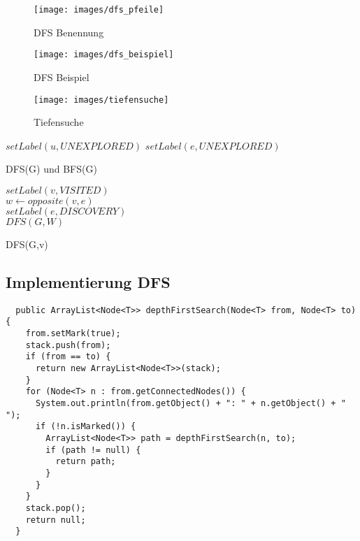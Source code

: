 \begin{figure}[ht!]
	\centering
	\begin{minipage}[t]{0.5\textwidth}
		\centering
		\texttt{[image: images/dfs\_pfeile]}
		\caption{DFS Benennung}
		\label{fig:dfsbenennung}
	\end{minipage}
	\centering
	\begin{minipage}[t]{1\textwidth}
		\centering
		\texttt{[image: images/dfs\_beispiel]}
		\caption{DFS Beispiel}
		\label{fig:dfsbeispiel}
	\end{minipage}
\end{figure}

\begin{figure}[h!]
	\centering
	\texttt{[image: images/tiefensuche]}
	\caption{Tiefensuche}
	\label{fig:tiefensuche}
\end{figure}


\begin{algorithm}[h!]
	{
		$setLabel(u, UNEXPLORED)$
	}
	{
		$setLabel(e, UNEXPLORED)$		
	}
	\caption{DFS(G) und BFS(G)}
\end{algorithm}

\clearpage
\begin{algorithm}[h!]
	$setLabel(v, VISITED)$ \\
	{
		 {
			$w \leftarrow opposite(v,e)$ \\
			 {
				$setLabel(e, DISCOVERY)$ \\
				$DFS(G,W)$
			}
		}
	}
	\caption{DFS(G,v)}
\end{algorithm}

\subsection{Implementierung DFS}
\begin{lstlisting}
  public ArrayList<Node<T>> depthFirstSearch(Node<T> from, Node<T> to) {
    from.setMark(true);
    stack.push(from);
    if (from == to) {
      return new ArrayList<Node<T>>(stack);
    }
    for (Node<T> n : from.getConnectedNodes()) {
      System.out.println(from.getObject() + ": " + n.getObject() + " ");
      if (!n.isMarked()) {
        ArrayList<Node<T>> path = depthFirstSearch(n, to);
        if (path != null) {
          return path;
        }
      }
    }
    stack.pop();
    return null;
  }
\end{lstlisting}

